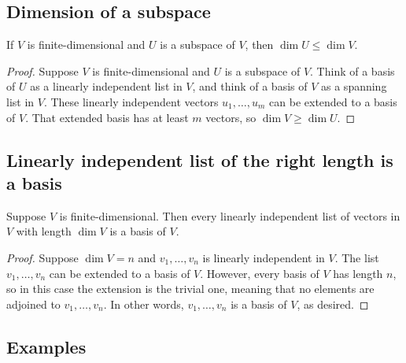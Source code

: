 \documentclass[11pt]{article}
\begin{document}
    \subsection{Dimension of a subspace}

    If $V$ is finite-dimensional and $U$ is a subspace of $V$, then \(\dim U \leq \dim V.\)

    \begin{proof}
        Suppose $V$ is finite-dimensional and $U$ is a subspace of $V$. Think of a basis of $U$ as a linearly independent list in $V$, and think of a basis of $V$ as a spanning list in $V$. These linearly independent vectors \(u_1, \dots, u_m\) can be extended to a basis of $V$. That extended basis has at least $m$ vectors, so \(\dim V \geq \dim U.\)
    \end{proof}

    \subsection{Linearly independent list of the right length is a basis}

    Suppose $V$ is finite-dimensional. Then every linearly independent list of vectors in $V$ with length \(\dim V\) is a basis of $V$.

    \begin{proof}
        Suppose \(\dim V = n\) and \(v_1, \dots, v_n\) is linearly independent in $V$. The list \(v_1, \dots, v_n\) can be extended to a basis of $V$. However, every basis of $V$ has length $n$, so in this case the extension is the trivial one, meaning that no elements are adjoined to \(v_1, \dots, v_n\). In other words, \(v_1, \dots, v_n\) is a basis of $V$, as desired.
    \end{proof}

    \subsection{Examples}
\end{document}
